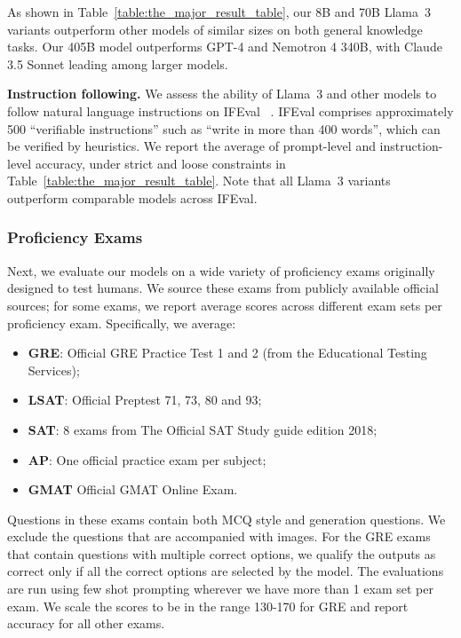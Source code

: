 As shown in Table~\ref{table:the_major_result_table}, our 8B and 70B Llama~3 variants outperform other models of similar sizes on both general knowledge tasks. Our 405B model outperforms GPT-4 and Nemotron 4 340B, with Claude 3.5 Sonnet leading among larger models.

\textbf{Instruction following.} We assess the ability of Llama~3 and other models to follow natural language instructions on IFEval ~\citep{zhou2023instruction}. IFEval comprises approximately 500 ``verifiable instructions'' such as ``write in more than 400 words'', which can be verified by heuristics. We report the average of prompt-level and instruction-level accuracy, under strict and loose constraints in Table~\ref{table:the_major_result_table}. Note that all Llama~3 variants outperform comparable models across IFEval.

\subsubsection{Proficiency Exams}
\label{subsec:proficiency}

Next, we evaluate our models on a wide variety of proficiency exams originally designed to test humans. We source these exams from publicly available official sources; for some exams, we report average scores across different exam sets per proficiency exam. Specifically, we average:

\begin{itemize}
    \item \textbf{GRE}: Official GRE Practice Test 1 and 2 (from the Educational Testing Services);
    \item \textbf{LSAT}: Official Preptest 71, 73, 80 and 93;
    \item \textbf{SAT}: 8 exams from The Official SAT Study guide edition 2018;
    \item \textbf{AP}: One official practice exam per subject;
    \item \textbf{GMAT} Official GMAT Online Exam.
\end{itemize}

Questions in these exams contain both MCQ style and generation questions. We exclude the questions that are accompanied with images. For the GRE exams that contain questions with multiple correct options, we qualify the outputs as correct only if all the correct options are selected by the model. The evaluations are run using few shot prompting wherever we have more than 1 exam set per exam. We scale the scores to be in the range 130-170 for GRE and report accuracy for all other exams.

